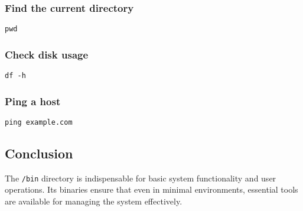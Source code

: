 \subsubsection*{Find the current directory}
\begin{lstlisting}
pwd
\end{lstlisting}

\subsubsection*{Check disk usage}
\begin{lstlisting}
df -h
\end{lstlisting}

\subsubsection*{Ping a host}
\begin{lstlisting}
ping example.com
\end{lstlisting}

\subsection*{Conclusion}

The \texttt{/bin} directory is indispensable for basic system functionality and user operations. Its binaries ensure that even in minimal environments, essential tools are available for managing the system effectively.

